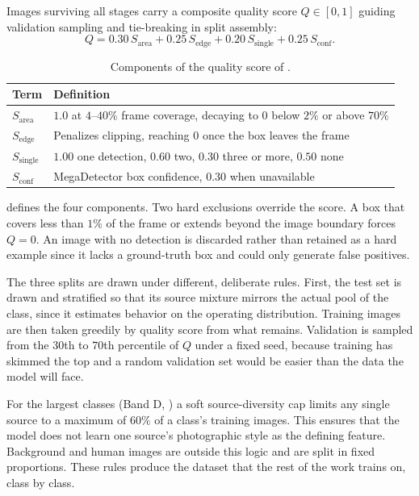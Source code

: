Images surviving all stages carry a composite quality score $Q \in [0,1]$ guiding validation sampling and tie-breaking in split assembly:
\begin{equation}
    Q = 0.30\,S_{\text{area}} + 0.25\,S_{\text{edge}} + 0.20\,S_{\text{single}} + 0.25\,S_{\text{conf}}.
    \label{eq:quality-score}
\end{equation}

\begin{table}[htbp]
\centering
\caption{Components of the quality score of .}
\label{tab:quality-score-components}
\begin{tabularx}{\textwidth}{@{}lX@{}}
\toprule
Term & Definition \\
\midrule
$S_{\text{area}}$ & $1.0$ at $4$--$40\%$ frame coverage, decaying to $0$ below $2\%$ or above $70\%$ \\
$S_{\text{edge}}$ & Penalizes clipping, reaching $0$ once the box leaves the frame \\
$S_{\text{single}}$ & $1.00$ one detection, $0.60$ two, $0.30$ three or more, $0.50$ none \\
$S_{\text{conf}}$ & MegaDetector box confidence, $0.30$ when unavailable \\
\bottomrule
\end{tabularx}
\end{table}

 defines the four components. Two hard exclusions override the score. A box that covers less than $1\%$ of the frame or extends beyond the image boundary forces $Q = 0$. An image with no detection is discarded rather than retained as a hard example since it lacks a ground-truth box and could only generate false positives.

The three splits are drawn under different, deliberate rules. First, the test set is drawn and stratified so that its source mixture mirrors the actual pool of the class, since it estimates behavior on the operating distribution. Training images are then taken greedily by quality score from what remains. Validation is sampled from the $30$th to $70$th percentile of $Q$ under a fixed seed, because training has skimmed the top and a random validation set would be easier than the data the model will face.

For the largest classes (Band D, ) a soft source-diversity cap limits any single source to a maximum of $60\%$ of a class's training images. This ensures that the model does not learn one source's photographic style as the defining feature. Background and human images are outside this logic and are split in fixed proportions. These rules produce the dataset that the rest of the work trains on, class by class.

